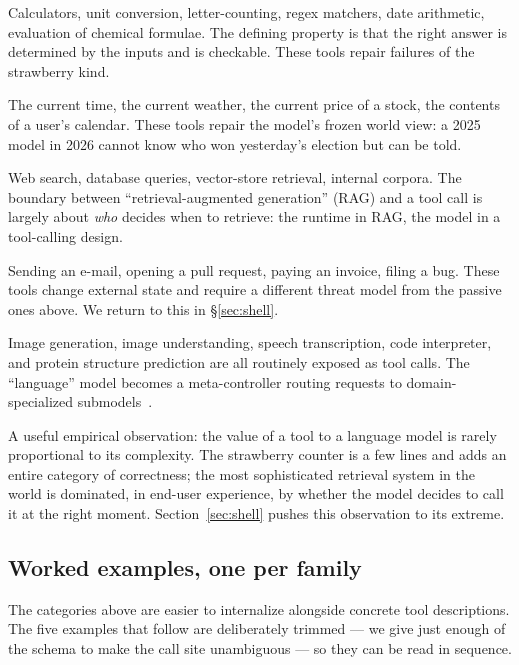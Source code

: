 \begin{description}[style=nextline,leftmargin=1.5em]
\item[Closed-form computation.] Calculators, unit conversion,
  letter-counting, regex matchers, date arithmetic, evaluation of
  chemical formulae. The defining property is that the right answer
  is determined by the inputs and is checkable. These tools repair
  failures of the strawberry kind.
\item[Real-world state.] The current time, the current weather, the
  current price of a stock, the contents of a user's calendar. These
  tools repair the model's frozen world view: a 2025 model in 2026
  cannot know who won yesterday's election but can be told.
\item[Information retrieval.] Web search, database queries,
  vector-store retrieval, internal corpora. The boundary between
  ``retrieval-augmented generation'' (RAG) and a tool call is
  largely about \emph{who} decides when to retrieve: the runtime in
  RAG, the model in a tool-calling design.
\item[Action in external systems.] Sending an e-mail, opening a pull
  request, paying an invoice, filing a bug. These tools change
  external state and require a different threat model from the
  passive ones above. We return to this in \S\ref{sec:shell}.
\item[Specialized models.] Image generation, image understanding,
  speech transcription, code interpreter, and protein structure
  prediction are all routinely exposed as tool calls. The
  ``language'' model becomes a meta-controller routing requests to
  domain-specialized submodels~\citep{patil2023gorilla}.
\end{description}

\noindent
A useful empirical observation: the value of a tool to a language
model is rarely proportional to its complexity. The strawberry
counter is a few lines and adds an entire category of correctness;
the most sophisticated retrieval system in the world is dominated, in
end-user experience, by whether the model decides to call it at the
right moment. Section~\ref{sec:shell} pushes this observation to its
extreme.

\subsection{Worked examples, one per family}
\label{sec:taxonomy-examples}

The categories above are easier to internalize alongside concrete
tool descriptions. The five examples that follow are deliberately
trimmed --- we give just enough of the schema to make the call site
unambiguous --- so they can be read in sequence.


